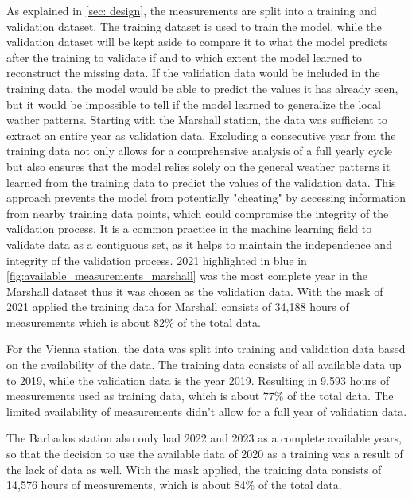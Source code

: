 As explained in \autoref{sec: design}, the measurements are split into a training and validation dataset. The training dataset is used to train the model, while the validation dataset will be kept aside to compare it to what the model predicts after the training to validate if and to which extent the model learned to reconstruct the missing data. If the validation data would be included in the training data, the model would be able to predict the values it has already seen, but it would be impossible to tell if the model learned to generalize the local wather patterns.
Starting with the Marshall station, the data was sufficient to extract an entire year as validation data. Excluding a consecutive year from the training data not only allows for a comprehensive analysis of a full yearly cycle but also ensures that the model relies solely on the general weather patterns it learned from the training data to predict the values of the validation data. This approach prevents the model from potentially "cheating" by accessing information from nearby training data points, which could compromise the integrity of the validation process. It is a common practice in the machine learning field to validate data as a contiguous set, as it helps to maintain the independence and integrity of the validation process. 2021 highlighted in blue in \ref{fig:available_measurements_marshall} was the most complete year in the Marshall dataset thus it was chosen as the validation data. With the mask of 2021 applied the training data for Marshall consists of 34,188 hours of measurements which is about 82\% of the total data.

For the Vienna station, the data was split into training and validation data based on the availability of the data. The training data consists of all available data up to 2019, while the validation data is the year 2019. Resulting in 9,593 hours of measurements used as training data, which is about 77\% of the total data. The limited availability of measurements didn't allow for a full year of validation data.

The Barbados station also only had 2022 and 2023 as a complete available years, so that the decision to use the available data of 2020 as a training was a result of the lack of data as well. With the mask applied, the training data consists of 14,576 hours of measurements, which is about 84\% of the total data.




